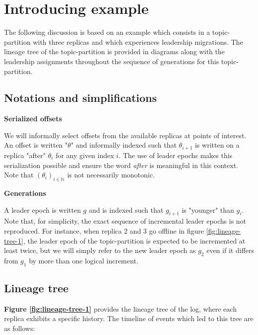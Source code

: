 \documentclass{article}
\begin{document}
\section{Introducing example}

The following discussion is based on an example which consists in a topic-partition with three replicas and which experiences leadership migrations. The lineage tree of the topic-partition is provided in diagrams along with the leadership assignments throughout the sequence of generations for this topic-partition.

\subsection{Notations and simplifications}

\textbf{Serialized offsets}

We will informally select offsets from the available replicas at points of interest. An offset is written "$\theta$" and informally indexed such that $\theta_{i+1}$ is written on a replica "after" $\theta_i$ for any given index $i$. The use of leader epochs makes this serialization possible and ensure the word \textit{after} is meaningful in this context. Note that $(\theta_i)_{i \in \mathbb{N}}$ is not necessarily monotonic. 

\textbf{Generations}

A leader epoch is written $g$ and is indexed such that $g_{i+1}$ is "younger" than $g_i$. Note that, for simplicity, the exact sequence of incremental leader epochs is not reproduced. For instance, when replica 2 and 3 go offline in figure \ref{fig:lineage-tree-1}, the leader epoch of the topic-partition is expected to be incremented at least twice, but we will simply refer to the new leader epoch as $g_2$ even if it differs from $g_1$ by more than one logical increment.

\subsection{Lineage tree}

\textbf{Figure \ref{fig:lineage-tree-1}} provides the lineage tree of the log, where each replica exhibits a specific history.
The timeline of events which led to this tree are as follows:
\end{document}
